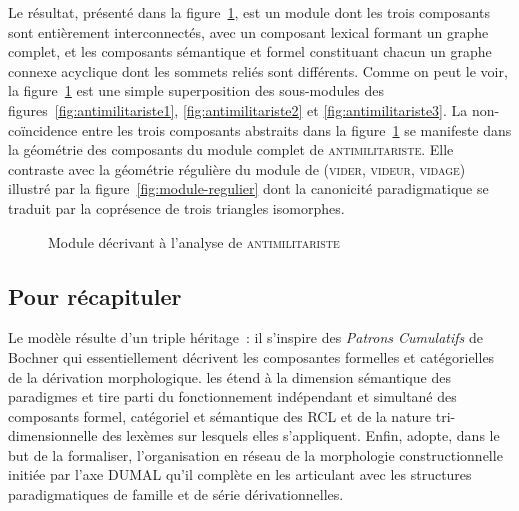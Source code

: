 \documentclass[output=paper]{langsci/langscibook}
\begin{document}
Le résultat, présenté dans la figure~\ref{fig:antimilitariste}, est un module dont les trois composants sont entièrement interconnectés, avec un composant lexical formant un graphe complet, et les composants sémantique et formel constituant chacun un graphe connexe acyclique dont les sommets reliés sont différents. Comme on peut le voir, la figure~\ref{fig:antimilitariste} est une simple superposition des sous-modules des figures~\ref{fig:antimilitariste1}, \ref{fig:antimilitariste2} et \ref{fig:antimilitariste3}. La non-coïncidence  entre les trois composants abstraits dans la figure~\ref{fig:antimilitariste} se manifeste dans la géométrie des composants du module complet de \textsc{antimilitariste}.  Elle contraste avec la géométrie régulière du module de (\textsc{vider}, \textsc{videur}, \textsc{vidage}) illustré par la figure~\ref{fig:module-regulier} dont la canonicité paradigmatique se traduit par la coprésence de trois triangles isomorphes.
%
\begin{figure}
  \centering
  \caption{Module décrivant à l'analyse de \textsc{antimilitariste}}
  \label{fig:antimilitariste}
\end{figure}

\subsection{Pour récapituler}
\label{sec:pour-recapituler}
Le modèle \paradis{} résulte d'un triple héritage~: il s'inspire des \emph{Patrons Cumulatifs} de Bochner qui essentiellement décrivent les composantes formelles et catégorielles de la dérivation morphologique.  \paradis{} les étend à la dimension sémantique des paradigmes et tire parti du fonctionnement indépendant et simultané des composants formel, catégoriel et sémantique des RCL et de la nature tri-dimensionnelle des lexèmes sur lesquels elles s'appliquent.  Enfin,  \paradis{} adopte, dans le but de la formaliser, l'organisation en réseau de la morphologie constructionnelle initiée par l'axe DUMAL qu'il complète en les articulant avec les structures paradigmatiques de famille et de série dérivationnelles.
\end{document}

